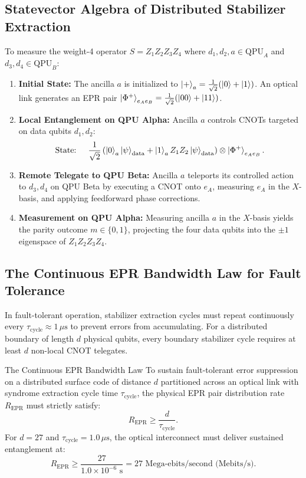 \subsection{Statevector Algebra of Distributed Stabilizer Extraction}
To measure the weight-4 operator $S = Z_1 Z_2 Z_3 Z_4$ where $d_1, d_2, a \in \text{QPU}_A$ and $d_3, d_4 \in \text{QPU}_B$:
\begin{enumerate}
    \item \textbf{Initial State:} The ancilla $a$ is initialized to $\ket{+}_a = \frac{1}{\sqrt{2}}(\ket{0} + \ket{1})$. An optical link generates an EPR pair $\ket{\Phi^+}_{e_A e_B} = \frac{1}{\sqrt{2}}(\ket{00} + \ket{11})$.
    \item \textbf{Local Entanglement on QPU Alpha:} Ancilla $a$ controls CNOTs targeted on data qubits $d_1, d_2$:
    \begin{equation}
        \text{State: } \quad \frac{1}{\sqrt{2}} \left( \ket{0}_a \ket{\psi}_{\text{data}} + \ket{1}_a Z_1 Z_2 \ket{\psi}_{\text{data}} \right) \otimes \ket{\Phi^+}_{e_A e_B}.
    \end{equation}
    \item \textbf{Remote Telegate to QPU Beta:} Ancilla $a$ teleports its controlled action to $d_3, d_4$ on QPU Beta by executing a CNOT onto $e_A$, measuring $e_A$ in the $X$-basis, and applying feedforward phase corrections.
    \item \textbf{Measurement on QPU Alpha:} Measuring ancilla $a$ in the $X$-basis yields the parity outcome $m \in \{0, 1\}$, projecting the four data qubits into the $\pm 1$ eigenspace of $Z_1 Z_2 Z_3 Z_4$.
\end{enumerate}

\subsection{The Continuous EPR Bandwidth Law for Fault Tolerance}
In fault-tolerant operation, stabilizer extraction cycles must repeat continuously every $\tau_{\text{cycle}} \approx 1\,\mu\text{s}$ to prevent errors from accumulating. For a distributed boundary of length $d$ physical qubits, every boundary stabilizer cycle requires at least $d$ non-local CNOT telegates.

\begin{theorembox}{The Continuous EPR Bandwidth Law}
To sustain fault-tolerant error suppression on a distributed surface code of distance $d$ partitioned across an optical link with syndrome extraction cycle time $\tau_{\text{cycle}}$, the physical EPR pair distribution rate $R_{\text{EPR}}$ must strictly satisfy:
\begin{equation}
    R_{\text{EPR}} \ge \frac{d}{\tau_{\text{cycle}}}.
    \label{eq:epr_bandwidth_law_ch13}
\end{equation}
For $d = 27$ and $\tau_{\text{cycle}} = 1.0\,\mu\text{s}$, the optical interconnect must deliver sustained entanglement at:
\begin{equation}
    R_{\text{EPR}} \ge \frac{27}{1.0 \times 10^{-6}\text{ s}} = 27\text{ Mega-ebits/second (Mebits/s)}.
\end{equation}
\end{theorembox}

